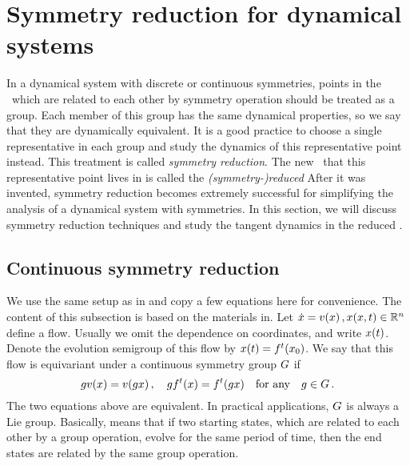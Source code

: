 \section{Symmetry reduction for dynamical systems}
\label{sec:symReduce}

In a dynamical system with discrete or continuous symmetries,
points in the \statesp\ which are related to each
other by symmetry operation should be treated as a group.
Each member of this group has the same dynamical properties, so
we say that they are dynamically equivalent.
It is a good practice to choose a single representative in each
group and study the dynamics of this representative point instead.
This treatment is called \emph{symmetry reduction}. The
new \statesp\ that this representative point lives in is called
the \emph{(symmetry-)reduced \statesp}
After it was invented, symmetry reduction becomes
extremely successful for simplifying the analysis
of a dynamical system with symmetries. In this section,
we will discuss symmetry reduction techniques and study
the tangent dynamics in the reduced \statesp.

\subsection{Continuous symmetry reduction}
\label{sec:cred}

We use the same setup as in  and copy a
few equations here for convenience.
The content of this subsection is based on the materials in.
Let $ \dot{x} = v(x) \,,x(x, t) \in \mathbb{R}^n$  define a flow.
Usually we omit the dependence on coordinates, and write $x(t)$.
Denote the evolution semigroup of this flow by $x(t)={f^{t}(x_0)}$.
We say that this flow
is equivariant under a continuous symmetry group $G$ if
\begin{equation}
  \label{eq:equivariant}
   g v(x) =  v(g x) \,,\quad
   g {f^{t}(x)} = {f^{t}(g x)}
   \quad \text{for any} \quad  g \in G
   \,.
\end{equation}
The two equations above are equivalent.
In practical applications, $G$ is always a Lie group.
Basically,
 means that if two starting states, which
are related to each other by a group operation, evolve for the same period of
time, then
the end states are related by the same group operation.

